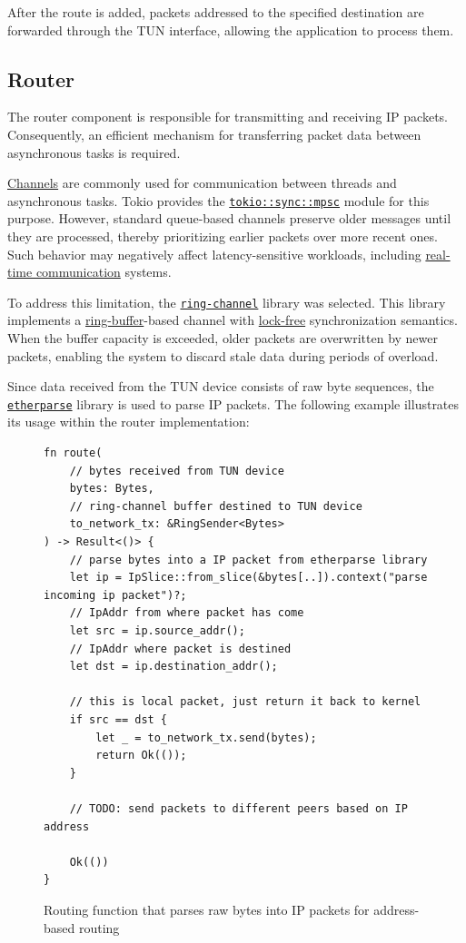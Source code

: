 \documentclass[a4paper, 10pt]{article}
\begin{document}
After the route is added, packets addressed to the specified destination are forwarded through the TUN interface,
allowing the application to process them.

\newpage

\subsection{Router} \label{sec:approuter}

The router component is responsible for transmitting and receiving IP packets.
Consequently, an efficient mechanism for transferring packet data between asynchronous tasks is required.

\href{https://en.wikipedia.org/wiki/Channel_(programming)}{Channels} are commonly used for communication between threads and asynchronous tasks.
Tokio provides the \href{https://docs.rs/tokio/latest/tokio/sync/mpsc/index.html}{\texttt{tokio::sync::mpsc}}
module for this purpose. However, standard queue-based channels preserve older messages until they are processed, thereby prioritizing earlier packets over more recent ones.
Such behavior may negatively affect latency-sensitive workloads, including
\href{https://en.wikipedia.org/wiki/Real-time_communication}{real-time communication} systems.

To address this limitation, the \href{https://github.com/brunocodutra/ring-channel}{\texttt{ring-channel}} library was selected.
This library implements a \href{https://en.wikipedia.org/wiki/Circular_buffer}{ring-buffer}-based channel
with \href{https://en.wikipedia.org/wiki/Non-blocking_algorithm}{lock-free} synchronization semantics.
When the buffer capacity is exceeded, older packets are overwritten by newer packets, enabling the system to discard stale data during periods of overload.

Since data received from the TUN device consists of raw byte sequences, the \href{https://crates.io/crates/etherparse}{\texttt{etherparse}}
library is used to parse IP packets. The following example illustrates its usage within the router implementation:
\begin{figure}[H]
  \begin{verbatim}
fn route(
    // bytes received from TUN device
    bytes: Bytes,
    // ring-channel buffer destined to TUN device
    to_network_tx: &RingSender<Bytes>
) -> Result<()> {
    // parse bytes into a IP packet from etherparse library
    let ip = IpSlice::from_slice(&bytes[..]).context("parse incoming ip packet")?;
    // IpAddr from where packet has come
    let src = ip.source_addr();
    // IpAddr where packet is destined
    let dst = ip.destination_addr();

    // this is local packet, just return it back to kernel
    if src == dst {
        let _ = to_network_tx.send(bytes);
        return Ok(());
    }

    // TODO: send packets to different peers based on IP address
    
    Ok(())
}
  \end{verbatim}
  \caption{Routing function that parses raw bytes into IP packets for address-based routing}
\end{figure}
\end{document}
